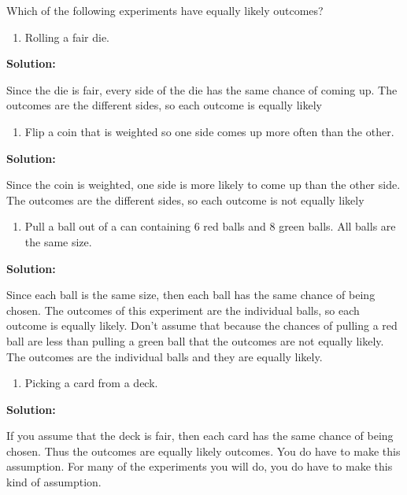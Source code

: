 \documentclass[
]{book}
\providecommand{\tightlist}{%
  \setlength{\itemsep}{0pt}\setlength{\parskip}{0pt}}
\begin{document}
Which of the following experiments have equally likely outcomes?

\begin{enumerate}
\def\labelenumi{\alph{enumi}.}
\tightlist
\item
  Rolling a fair die.
\end{enumerate}

\textbf{Solution:}

Since the die is fair, every side of the die has the same chance of coming up. The outcomes are the different sides, so each outcome is equally likely

\begin{enumerate}
\def\labelenumi{\alph{enumi}.}
\setcounter{enumi}{1}
\tightlist
\item
  Flip a coin that is weighted so one side comes up more often than the other.
\end{enumerate}

\textbf{Solution:}

Since the coin is weighted, one side is more likely to come up than the other side. The outcomes are the different sides, so each outcome is not equally likely

\begin{enumerate}
\def\labelenumi{\alph{enumi}.}
\setcounter{enumi}{2}
\tightlist
\item
  Pull a ball out of a can containing 6 red balls and 8 green balls. All balls are the same size.
\end{enumerate}

\textbf{Solution:}

Since each ball is the same size, then each ball has the same chance of being chosen. The outcomes of this experiment are the individual balls, so each outcome is equally likely. Don't assume that because the chances of pulling a red ball are less than pulling a green ball that the outcomes are not equally likely. The outcomes are the individual balls and they are equally likely.

\begin{enumerate}
\def\labelenumi{\alph{enumi}.}
\setcounter{enumi}{3}
\tightlist
\item
  Picking a card from a deck.
\end{enumerate}

\textbf{Solution:}

If you assume that the deck is fair, then each card has the same chance of being chosen. Thus the outcomes are equally likely outcomes. You do have to make this assumption. For many of the experiments you will do, you do have to make this kind of assumption.
\end{document}
